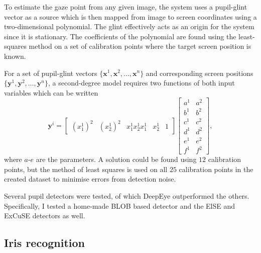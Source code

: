 To estimate the gaze point from any given image, the system uses a pupil-glint vector as a source which is then mapped from image to screen coordinates using a two-dimensional polynomial. The glint effectively acts as an origin for the system since it is stationary. The coefficients of the polynomial are found using the least-squares method on a set of calibration points where the target screen position is known.

For a set of pupil-glint vectors $\{\mathbf{x}^1, \mathbf{x}^2, \dots, \mathbf{x}^n\}$ and corresponding screen positions $\{\mathbf{y}^1, \mathbf{y}^2, \dots, \mathbf{y}^n\}$, a second-degree model requires two functions of both input variables which can be written
\begin{equation}
    \mathbf{y}^i =  \begin{bmatrix}
        \left(x_1^{1}\right)^2 & \left(x_2^{1}\right)^2 & x_1^1x_2^1 x_1^1 & x_2^1 & 1\end{bmatrix} \begin{bmatrix}a^1&a^2\\ b^1&b^2\\ c^1&c^2\\ d^1&d^2\\ e^1&e^2\\ f^1&f^2\end{bmatrix},
\end{equation}
where $a$-$e$ are the parameters. A solution could be found using $12$ calibration points, but the method of least squares is used on all $25$ calibration points in the created dataset to minimise errors from detection noise. 

Several pupil detectors were tested, of which DeepEye \parencite{vera2019deepeye} outperformed the others. Specifically, I tested a home-made BLOB based detector and the ElSE \parencite{fuhl2016else} and ExCuSE \parencite{excuse} detectors as well.

\subsection{Iris recognition}





